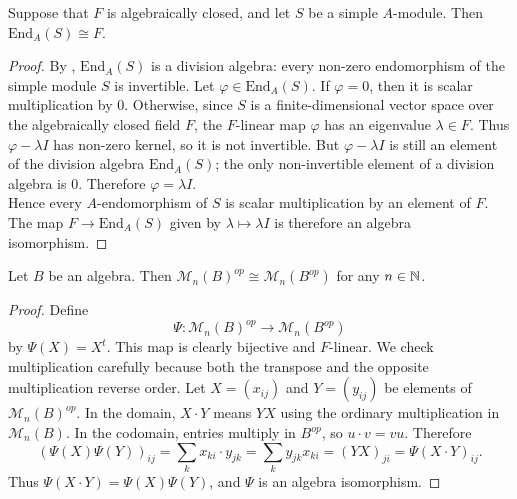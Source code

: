 \documentclass[../Odyssey_Project.tex]{subfiles}
\begin{document}
\begin{lemma}
\label{lem:13.14}
Suppose that $F$ is algebraically closed, and let $S$ be a simple $A$-module. Then $\mathrm{End}_A(S) \cong F$.
\end{lemma}
\begin{proof}
    By , $\mathrm{End}_A(S)$ is a division algebra: every non-zero endomorphism of the simple module $S$ is invertible. Let $\varphi \in \mathrm{End}_A(S)$. If $\varphi=0$, then it is scalar multiplication by $0$. Otherwise, since $S$ is a finite-dimensional vector space over the algebraically closed field $F$, the $F$-linear map $\varphi$ has an eigenvalue $\lambda \in F$. Thus $\varphi - \lambda I$ has non-zero kernel, so it is not invertible. But $\varphi - \lambda I$ is still an element of the division algebra $\mathrm{End}_A(S)$; the only non-invertible element of a division algebra is $0$. Therefore $\varphi = \lambda I$.\\
    Hence every $A$-endomorphism of $S$ is scalar multiplication by an element of $F$. The map $F \to \mathrm{End}_A(S)$ given by $\lambda \mapsto \lambda I$ is therefore an algebra isomorphism.
\end{proof}

\begin{lemma}
\label{lem:13.15}
Let $B$ be an algebra. Then $\mathcal{M}_n(B)^{op} \cong \mathcal{M}_n(B^{op})$ for any $n \in \mathbb{N}$.
\end{lemma}
\begin{proof}
    Define
    \[
        \Psi \colon \mathcal{M}_n(B)^{op} \to \mathcal{M}_n(B^{op})
    \]
    by $\Psi(X) = X^t$. This map is clearly bijective and $F$-linear. We check multiplication carefully because both the transpose and the opposite multiplication reverse order. Let $X=(x_{ij})$ and $Y=(y_{ij})$ be elements of $\mathcal{M}_n(B)^{op}$. In the domain, $X \cdot Y$ means $YX$ using the ordinary multiplication in $\mathcal{M}_n(B)$. In the codomain, entries multiply in $B^{op}$, so $u \cdot v = vu$. Therefore
    \[
        (\Psi(X)\Psi(Y))_{ij}
        = \sum_k x_{ki} \cdot y_{jk}
        = \sum_k y_{jk}x_{ki}
        = (YX)_{ji}
        = \Psi(X \cdot Y)_{ij}.
    \]
    Thus $\Psi(X \cdot Y)=\Psi(X)\Psi(Y)$, and $\Psi$ is an algebra isomorphism.
\end{proof}
\end{document}
